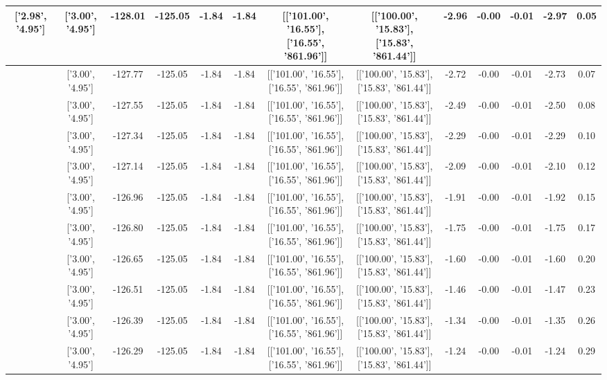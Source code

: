 \begin{table}[htbp]
\begin{adjustbox}{angle=90}
\begin{tabular}{|c|c|c|c|c|c|c|c|c|c|c|c|c|}
 ['2.98', '4.95'] & ['3.00', '4.95'] & -128.01 & -125.05 & -1.84 & -1.84 & [['101.00', '16.55'], ['16.55', '861.96']] & [['100.00', '15.83'], ['15.83', '861.44']] & -2.96 & -0.00 & -0.01 & -2.97 & 0.05\\ \hline
 ['2.98', '4.95'] & ['3.00', '4.95'] & -127.77 & -125.05 & -1.84 & -1.84 & [['101.00', '16.55'], ['16.55', '861.96']] & [['100.00', '15.83'], ['15.83', '861.44']] & -2.72 & -0.00 & -0.01 & -2.73 & 0.07\\ \hline
 ['2.98', '4.95'] & ['3.00', '4.95'] & -127.55 & -125.05 & -1.84 & -1.84 & [['101.00', '16.55'], ['16.55', '861.96']] & [['100.00', '15.83'], ['15.83', '861.44']] & -2.49 & -0.00 & -0.01 & -2.50 & 0.08\\ \hline
 ['2.98', '4.95'] & ['3.00', '4.95'] & -127.34 & -125.05 & -1.84 & -1.84 & [['101.00', '16.55'], ['16.55', '861.96']] & [['100.00', '15.83'], ['15.83', '861.44']] & -2.29 & -0.00 & -0.01 & -2.29 & 0.10\\ \hline
 ['2.98', '4.95'] & ['3.00', '4.95'] & -127.14 & -125.05 & -1.84 & -1.84 & [['101.00', '16.55'], ['16.55', '861.96']] & [['100.00', '15.83'], ['15.83', '861.44']] & -2.09 & -0.00 & -0.01 & -2.10 & 0.12\\ \hline
 ['2.99', '4.95'] & ['3.00', '4.95'] & -126.96 & -125.05 & -1.84 & -1.84 & [['101.00', '16.55'], ['16.55', '861.96']] & [['100.00', '15.83'], ['15.83', '861.44']] & -1.91 & -0.00 & -0.01 & -1.92 & 0.15\\ \hline
 ['2.99', '4.95'] & ['3.00', '4.95'] & -126.80 & -125.05 & -1.84 & -1.84 & [['101.00', '16.55'], ['16.55', '861.96']] & [['100.00', '15.83'], ['15.83', '861.44']] & -1.75 & -0.00 & -0.01 & -1.75 & 0.17\\ \hline
 ['2.99', '4.95'] & ['3.00', '4.95'] & -126.65 & -125.05 & -1.84 & -1.84 & [['101.00', '16.55'], ['16.55', '861.96']] & [['100.00', '15.83'], ['15.83', '861.44']] & -1.60 & -0.00 & -0.01 & -1.60 & 0.20\\ \hline
 ['2.99', '4.95'] & ['3.00', '4.95'] & -126.51 & -125.05 & -1.84 & -1.84 & [['101.00', '16.55'], ['16.55', '861.96']] & [['100.00', '15.83'], ['15.83', '861.44']] & -1.46 & -0.00 & -0.01 & -1.47 & 0.23\\ \hline
 ['2.99', '4.95'] & ['3.00', '4.95'] & -126.39 & -125.05 & -1.84 & -1.84 & [['101.00', '16.55'], ['16.55', '861.96']] & [['100.00', '15.83'], ['15.83', '861.44']] & -1.34 & -0.00 & -0.01 & -1.35 & 0.26\\ \hline
 ['2.99', '4.95'] & ['3.00', '4.95'] & -126.29 & -125.05 & -1.84 & -1.84 & [['101.00', '16.55'], ['16.55', '861.96']] & [['100.00', '15.83'], ['15.83', '861.44']] & -1.24 & -0.00 & -0.01 & -1.24 & 0.29\\ \hline

\end{tabular}
\end{adjustbox}
\end{table}
